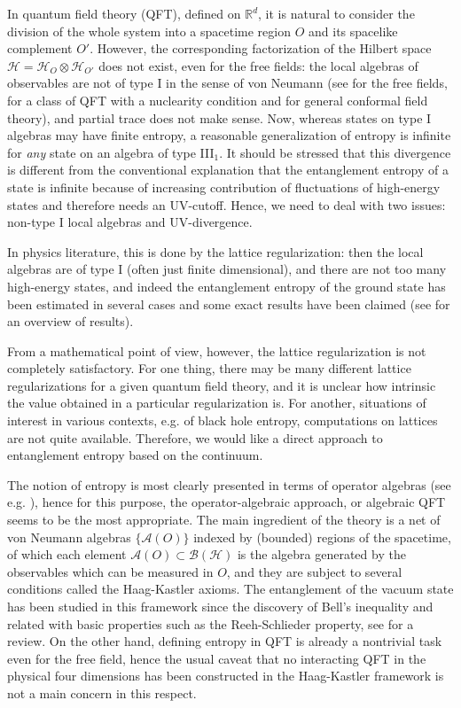 \documentclass[a4paper,12pt]{article}
\theoremstyle{plain}
\theoremstyle{definition}
\theoremstyle{remark}
\def\RR{{\mathbb R}}
\def\A{{\mathcal A}}
\def\B{{\mathcal B}}
\def\H{{\mathcal H}}
\begin{document}
In quantum field theory (QFT), defined on $\RR^d$, it is natural to consider the division of the whole system
into a spacetime region $O$ and its spacelike complement $O'$.
However, the corresponding factorization of the Hilbert space $\H = \H_O\otimes\H_{O'}$ does not exist, even
for the free fields: the local algebras of observables are not of type I in the sense of von Neumann
(see \cite{Araki64} for the free fields, \cite{bdf87} for a class of QFT with a nuclearity condition
and \cite{BGL93} for general conformal field theory),
and partial trace does not make sense.
Now, whereas states on type I algebras may have finite entropy, a
reasonable generalization of entropy is infinite for \emph{any} state on
an algebra of type III$_1$.  It should be stressed that this
divergence is different from the conventional explanation that the
entanglement entropy of a state is infinite because of increasing
contribution of fluctuations of high-energy states and therefore needs
an UV-cutoff. Hence, we need to deal with two issues: non-type I local
algebras and UV-divergence.

In physics literature, this is done by the lattice regularization:
then the local algebras are of type I (often just finite dimensional), and
there are not too many high-energy states, and indeed the entanglement entropy of the ground state
has been estimated in several cases and some exact results have been claimed (see \cite{calcar04} for an overview of results).

From a mathematical point of view, however, the lattice regularization is not completely satisfactory.
For one thing, there may be many different lattice regularizations for a given quantum field theory,
and it is unclear how intrinsic the value obtained in a particular regularization is.
For another, situations of interest in various contexts, e.g.\! of black hole entropy, computations on lattices are not
quite available. Therefore, we would like a direct approach to entanglement entropy based on the continuum.

The notion of entropy is most clearly presented in terms of operator algebras (see e.g.\! \cite{ohyapetz}),
hence for this purpose, the operator-algebraic approach, or algebraic QFT \cite{haag,araki} seems to be the most appropriate.
The main ingredient of the theory is a net of von Neumann algebras $\{\A(O)\}$ indexed by (bounded) regions of the spacetime,
of which each element $\A(O) \subset \B(\H)$ is the algebra generated by the observables which can be measured in $O$,
and they are subject to several conditions called the Haag-Kastler axioms.
The entanglement of the vacuum state has been studied in this framework since the discovery of Bell's inequality
\cite{SW85, SW87} and related with basic properties such as the Reeh-Schlieder property, see \cite{Yngvason15} for a review.
On the other hand, defining entropy in QFT is already a nontrivial task even for the free field, hence the usual caveat
that no interacting QFT in the physical four dimensions has been constructed in the Haag-Kastler framework is not a main concern in this respect.
\end{document}
